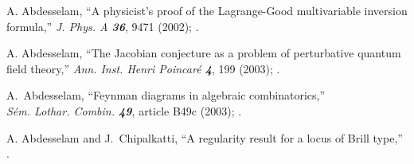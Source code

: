 




 A. Abdesselam,
    ``A physicist's proof of the Lagrange-Good
      multivariable inversion formula,''
    {\em J. Phys. A \bf  36}, 9471 (2002); %
    .

 A. Abdesselam,
    {``The Jacobian conjecture as a problem
    of perturbative quantum field theory,''}
    {\em Ann. Inst. Henri Poincar{\'e}  \bf 4}, 199 (2003); %
    .

 A.~Abdesselam,
    {``Feynman diagrams in algebraic combinatorics,''}
    \\
    {\em S\'em. Lothar. Combin. \bf 49}, article B49c (2003);
        .

 A. Abdesselam and J.~Chipalkatti,
    {``A regularity result for a locus of Brill type,''}
        .

